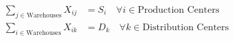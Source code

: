 \documentclass{article}
\begin{document}
\begin{equation}
    \begin{aligned}
        \sum_{j \in \text{Warehouses}} X_{ij} &= S_i \quad \forall i \in \text{Production Centers} \\
        \sum_{i \in \text{Warehouses}} X_{ik} &= D_k \quad \forall k \in \text{Distribution Centers}
    \end{aligned}
\end{equation}
\end{document}
